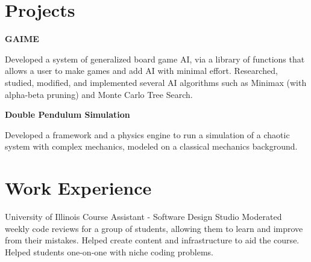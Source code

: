 \documentclass[10pt]{article} %
\begin{document}
\begin{paracol}{2}

\section{Projects}

{\raggedright\textbf{GAIME}\\\medskip}

Developed a system of generalized board game AI, via a library of functions that allows a user to make games and add AI with minimal effort. Researched, studied, modified, and implemented several AI algorithms such as Minimax (with alpha-beta pruning) and Monte Carlo Tree Search.\\

{\raggedright\textbf{Double Pendulum Simulation}\\\medskip}

Developed a framework and a physics engine to run a simulation of a chaotic system with complex mechanics, modeled on a classical mechanics background.


\section{Work Experience}





{} %
{University of Illinois} %
{Course Assistant - Software Design Studio} %
{Moderated weekly code reviews for a group of students, allowing them to learn and improve from their mistakes. Helped create content and infrastructure to aid the course. Helped students one-on-one with niche coding problems.}\\ %


\end{paracol}
\end{document}
